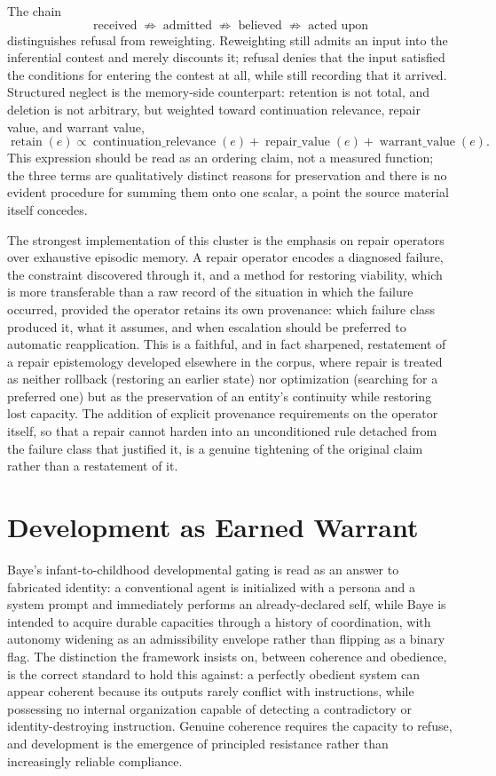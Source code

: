 \documentclass[11pt]{article}
\begin{document}
The chain
\[
\text{received} \;\not\Rightarrow\; \text{admitted} \;\not\Rightarrow\; \text{believed} \;\not\Rightarrow\; \text{acted upon}
\]
distinguishes refusal from reweighting. Reweighting still admits an input into the inferential contest and merely discounts it; refusal denies that the input satisfied the conditions for entering the contest at all, while still recording that it arrived. Structured neglect is the memory-side counterpart: retention is not total, and deletion is not arbitrary, but weighted toward continuation relevance, repair value, and warrant value,
\[
\operatorname{retain}(e) \propto \operatorname{continuation\_relevance}(e) + \operatorname{repair\_value}(e) + \operatorname{warrant\_value}(e).
\]
This expression should be read as an ordering claim, not a measured function; the three terms are qualitatively distinct reasons for preservation and there is no evident procedure for summing them onto one scalar, a point the source material itself concedes.

The strongest implementation of this cluster is the emphasis on repair operators over exhaustive episodic memory. A repair operator encodes a diagnosed failure, the constraint discovered through it, and a method for restoring viability, which is more transferable than a raw record of the situation in which the failure occurred, provided the operator retains its own provenance: which failure class produced it, what it assumes, and when escalation should be preferred to automatic reapplication. This is a faithful, and in fact sharpened, restatement of a repair epistemology developed elsewhere in the corpus, where repair is treated as neither rollback (restoring an earlier state) nor optimization (searching for a preferred one) but as the preservation of an entity's continuity while restoring lost capacity. The addition of explicit provenance requirements on the operator itself, so that a repair cannot harden into an unconditioned rule detached from the failure class that justified it, is a genuine tightening of the original claim rather than a restatement of it.

\section{Development as Earned Warrant}

Baye's infant-to-childhood developmental gating is read as an answer to fabricated identity: a conventional agent is initialized with a persona and a system prompt and immediately performs an already-declared self, while Baye is intended to acquire durable capacities through a history of coordination, with autonomy widening as an admissibility envelope rather than flipping as a binary flag. The distinction the framework insists on, between coherence and obedience, is the correct standard to hold this against: a perfectly obedient system can appear coherent because its outputs rarely conflict with instructions, while possessing no internal organization capable of detecting a contradictory or identity-destroying instruction. Genuine coherence requires the capacity to refuse, and development is the emergence of principled resistance rather than increasingly reliable compliance.
\end{document}
